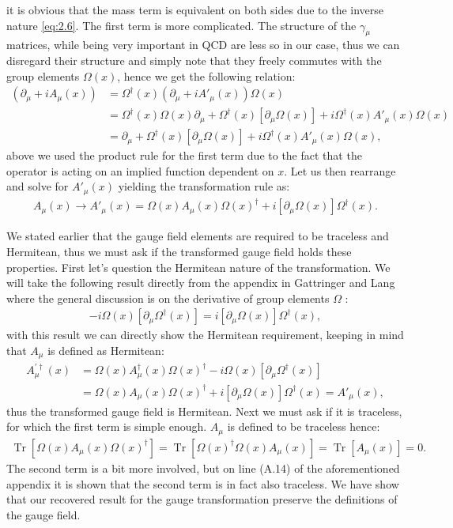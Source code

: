 \documentclass[english,twoside,openright]{UH_TCM_MSc}
\DeclareMathOperator{\Tr}{Tr}
\begin{document}
it is obvious that the mass term is equivalent on both sides due to the inverse nature \ref{eq:2.6}. The first term is more complicated. The structure of the $\gamma_\mu$ matrices, while being very important in QCD are less so in our case, thus we can disregard their structure and simply note that they freely commutes with the group elements $\Omega(x)$, hence we get the following relation:
\begin{align}
    (\partial_\mu + iA_\mu(x)) &= \Omega^\dagger(x)(\partial_\mu + iA'_\mu(x))\Omega(x) \label{eq:2.10} \\ 
    &= \Omega^\dagger(x)\Omega(x)\partial_\mu + \Omega^\dagger(x)[\partial_\mu\Omega(x)] + i\Omega^\dagger(x)A'_\mu(x)\Omega(x) \\ 
    &= \partial_\mu + \Omega^\dagger(x)[\partial_\mu\Omega(x)] + i\Omega^\dagger(x)A'_\mu(x)\Omega(x),
\end{align}
above we used the product rule for the first term due to the fact that the operator is acting on an implied function dependent on $x$. Let us then rearrange and solve for $A'_\mu(x)$ yielding the transformation rule as:
\begin{align}
    A_\mu(x) \rightarrow A'_\mu(x) = \Omega(x)A_\mu(x)\Omega(x)^\dagger + i[\partial_\mu\Omega(x)]\Omega^\dagger(x). \label{eg:2.13}
\end{align}

We stated earlier that the gauge field elements are required to be traceless and Hermitean, thus we must ask if the transformed gauge field holds these properties. First let's question the Hermitean nature of the transformation. We will take the following result directly from the appendix in Gattringer and Lang \cite[p.~329 A.1.4]{gattringer2009quantum} where the general discussion is on the derivative of group elements $\Omega$ :
\begin{align}
    -i\Omega(x)[\partial_\mu\Omega^\dagger(x)] = i[\partial_\mu\Omega(x)]\Omega^\dagger(x),
\end{align}
with this result we can directly show the Hermitean requirement, keeping in mind that $A_\mu$ is defined as Hermitean:
\begin{align}
    A_\mu^{'\dagger}(x) &= \Omega(x)A^\dagger_\mu(x)\Omega(x)^\dagger-i\Omega(x)[\partial_\mu\Omega^\dagger(x)] \\
    &= \Omega(x)A_\mu(x)\Omega(x)^\dagger + i[\partial_\mu\Omega(x)]\Omega^\dagger(x) = A'_\mu(x),
\end{align}
thus the transformed gauge field is Hermitean. Next we must ask if it is traceless, for which the first term is simple enough. $A_\mu$ is defined to be traceless hence:
\begin{align}
    \Tr[\Omega(x)A_\mu(x)\Omega(x)^\dagger] = \Tr[\Omega(x)^\dagger\Omega(x)A_\mu(x)] = \Tr[A_\mu(x)] = 0.
\end{align}
The second term is a bit more involved, but on line (A.14) of the aforementioned appendix it is shown that the second term is in fact also traceless.  We have show that our recovered result for the gauge transformation preserve the definitions of the gauge field. 
\end{document}
